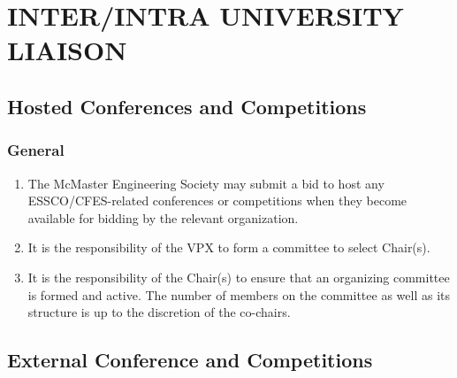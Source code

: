 


% 

\hypertarget{interintra-university-liaison}{%
 \section{INTER/INTRA UNIVERSITY
  LIAISON}
 \label{interintra-university-liaison}}

\hypertarget{hosted-conferences-and-competitions}{%
 \subsection{Hosted Conferences and
  Competitions}
 \label{hosted-conferences-and-competitions}}

\hypertarget{general}{%
 \subsubsection{General}
 \label{general}}

\begin{enumerate}
 \item
  The McMaster Engineering Society may submit a bid to host any
  ESSCO/CFES-related conferences or competitions when they become
  available for bidding by the relevant organization.
 \item
  It is the responsibility of the VPX to form a committee to select
  Chair(s).
 \item
  It is the responsibility of the Chair(s) to ensure that an organizing
  committee is formed and active. The number of members on the committee
  as well as its structure is up to the discretion of the co-chairs.

\end{enumerate}

\hypertarget{external-conference-and-competitions}{%
 \subsection{External Conference and
  Competitions}
 \label{external-conference-and-competitions}}

